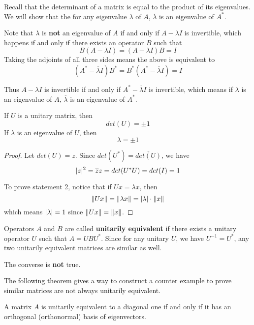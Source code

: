 \begin{lproof}
Recall that the determinant of a matrix is equal to the product of its eigenvalues. We will show that the for any eigenvalue $\lambda$ of $A$, $\overline{\lambda}$ is an eigenvalue of $A^{*}$. 

Note that $\lambda$ is \textbf{not} an eigenvalue of $A$ if and only if $A - \lambda I$ is invertible, which happens if and only if there exists an operator $B$ such that 
$$B(A - \lambda I) = (A - \lambda I)B = I$$
Taking the adjoints of all three sides means the above is equivalent to 
$$(A^{*} - \overline{\lambda}I)B^{*} = B^{*} (A^{*} - \overline{\lambda}I) = I$$

Thus $A - \lambda I$ is invertible if and only if $A^{*} - \overline{\lambda}I$ is invertible, which means if $\lambda$ is an eigenvalue of $A$, $\overline{\lambda}$ is an eigenvalue of $A^{*}$. 
\end{lproof}

\begin{theorem}
If $U$ is a unitary matrix, then 
$$ det(U) = \pm 1$$
If $\lambda$ is an eigenvalue of $U$, then 
$$\lambda = \pm 1$$
\end{theorem}

\begin{proof}
Let $det(U) = z$. Since $det(U^{*}) = \overline{det(U)}$, we have 
$$\lvert z\rvert^{2} = \overline{z}z = det(U^{*} U) = det(I) = 1$$

To prove statement 2, notice that if $Ux = \lambda x$, then 
$$\lVert Ux\rVert = \lVert\lambda x\rVert = \lvert\lambda\rvert \cdot \lVert x\rVert$$
which means $\lvert\lambda\rvert = 1$ since $\lVert Ux\rVert = \lVert x\rVert$. 
\end{proof}

\begin{definition}
Operators $A$ and $B$ are called \textbf{unitarily equivalent} if there exists a unitary operator $U$ such that $A = UBU^{*}$. Since for any unitary $U$, we have $U^{-1} = U^{*}$, any two unitarily equivalent matrices are similar as well. 

The converse is \textbf{not} true. 
\end{definition}

The following theorem gives a way to construct a counter example to prove similar matrices are not always unitarily equivalent. 

\begin{theorem}
A matrix $A$ is unitarily equivalent to a diagonal one if and only if it has an orthogonal (orthonormal) basis of eigenvectors. 
\end{theorem}

